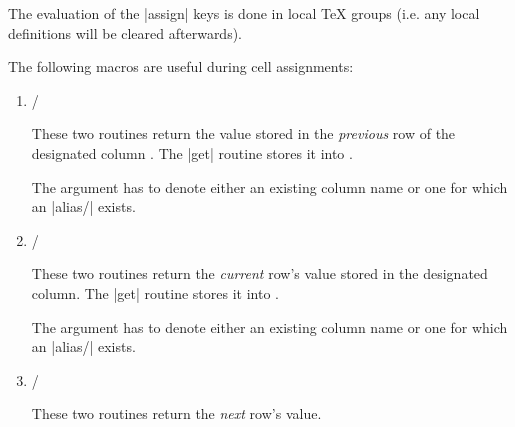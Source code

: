 \documentclass[a4paper]{ltxdoc}
\begin{document}
\begin{command}{\pgfplotstablecreatecol{}}
    The evaluation of the |assign| keys is done in local \TeX{} groups (i.e.\@
    any local definitions will be cleared afterwards).

    The following macros are useful during cell assignments:
    \begin{enumerate}
        \item \declareandlabel{\prevrow} /
            \declareandlabel{\getprevrow}

            These two routines return the value stored in the \emph{previous}
            row of the designated column . The |get| routine
            stores it into .

            The argument  has to denote either an existing
            column name or one for which an |alias/| exists.
        \item \declareandlabel{\thisrow} /
            \declareandlabel{\getthisrow}

            These two routines return the \emph{current} row's value stored
            in the designated column. The |get| routine stores it into
            .

            The argument  has to denote either an existing
            column name or one for which an |alias/| exists.
        \item \declareandlabel{\nextrow} /
            \declareandlabel{\getnextrow}

            These two routines return the \emph{next} row's value.


\end{enumerate}
\end{command}
\end{document}
